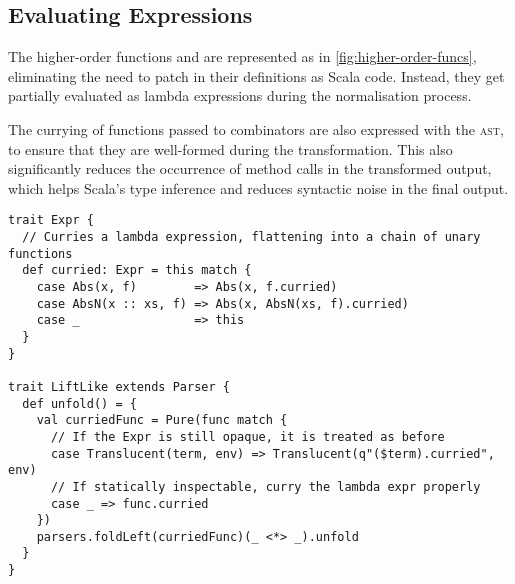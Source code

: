 \documentclass[../../main.tex]{subfiles}
\begin{document}
\subsection{Evaluating Expressions}
The higher-order functions  and  are represented as in \cref{fig:higher-order-funcs}, eliminating the need to patch in their definitions as Scala code.
Instead, they get partially evaluated as lambda expressions during the normalisation process.

The currying of functions passed to  combinators are also expressed with the  \textsc{ast}, to ensure that they are well-formed during the transformation.
This also significantly reduces the occurrence of  method calls in the transformed output, which helps Scala's type inference and reduces syntactic noise in the final output.
\begin{verbatim}
trait Expr {
  // Curries a lambda expression, flattening into a chain of unary functions
  def curried: Expr = this match {
    case Abs(x, f)        => Abs(x, f.curried)
    case AbsN(x :: xs, f) => Abs(x, AbsN(xs, f).curried)
    case _                => this
  }
}

trait LiftLike extends Parser {
  def unfold() = {
    val curriedFunc = Pure(func match {
      // If the Expr is still opaque, it is treated as before
      case Translucent(term, env) => Translucent(q"($term).curried", env)
      // If statically inspectable, curry the lambda expr properly
      case _ => func.curried
    })
    parsers.foldLeft(curriedFunc)(_ <*> _).unfold
  }
}
\end{verbatim}

\end{document}
